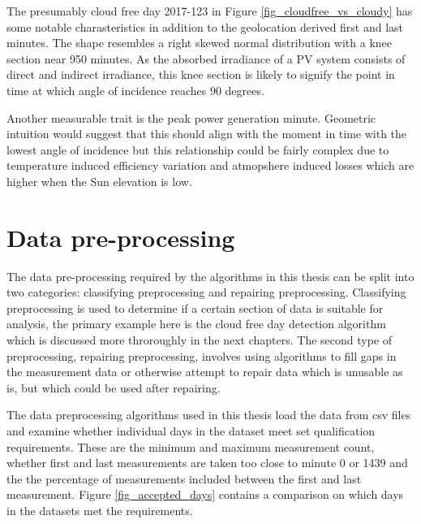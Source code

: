 \noindent The presumably cloud free day 2017-123 in Figure \ref{fig_cloudfree_vs_cloudy} has some notable charasteristics in addition to the geolocation derived first and last minutes. The shape resembles a right skewed normal distribution with a knee section near 950 minutes. As the absorbed irradiance of a PV system consists of direct and indirect irradiance, this knee section is likely to signify the point in time at which angle of incidence reaches 90 degrees.

Another measurable trait is the peak power generation minute. Geometric intuition would suggest that this should align with the moment in time with the lowest angle of incidence but this relationship could be fairly complex due to temperature induced efficiency variation and atmopshere induced losses which are higher when the Sun elevation is low.





\newpage
\section{Data pre-processing}
The data pre-processing required by the algorithms in this thesis can be split into two categories: classifying preprocessing and repairing preprocessing. Classifying preprocessing is used to determine if a certain section of data is suitable for analysis, the primary example here is the cloud free day detection algorithm which is discussed more throroughly in the next chapters. The second type of preprocessing, repairing preprocessing, involves using algorithms to fill gaps in the measurement data or otherwise attempt to repair data  which is unusable as is, but which could be used after repairing.

The data preprocessing algorithms used in this thesis load the data from csv files and examine whether individual days in the dataset meet set qualification requirements. These are the minimum and maximum measurement count, whether first and last measurements are taken too close to minute 0 or 1439 and the the percentage of measurements included between the first and last measurement. Figure \ref{fig_accepted_days} contains a comparison on which days in the datasets met the requirements.


